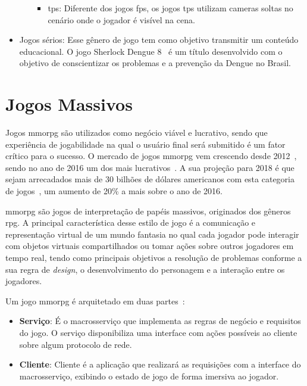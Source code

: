 \begin{itemize}
\begin{itemize}
\begin{itemize}
          \item \ac{tps}: Diferente dos jogos \ac{fps}, os jogos \ac{tps} utilizam cameras soltas no cenário onde o jogador é visível na cena.
        \end{itemize}
    \end{itemize}
  \item Jogos sérios: Esse gênero de jogo tem como objetivo transmitir um conteúdo educacional. O jogo Sherlock Dengue 8~\cite{sherlock_dengue} é um título desenvolvido com o objetivo de conscientizar os problemas e a prevenção da Dengue no Brasil.
\end{itemize}


\section{Jogos Massivos}
\label{sec:mmorpg}



Jogos \ac{mmorpg} são utilizados como negócio viável e lucrativo, sendo que experiência de jogabilidade na qual o usuário final será submitido é um fator crítico para o sucesso.
%
O mercado de jogos \ac{mmorpg} vem crescendo desde 2012~\cite{new_york_times}, sendo no ano de 2016 um dos mais lucrativos~\cite{statista_2016}.
%
A sua projeção para 2018 é que sejam arrecadados mais de 30 bilhões de dólares americanos com esta categoria de jogos~\cite{statista_2018}, um aumento de 20\% a mais sobre o ano de 2016.



\ac{mmorpg} são jogos de interpretação de papéis massivos, originados dos gêneros \ac{rpg}.
%
A principal característica desse estilo de jogo é a comunicação e representação virtual de um mundo fantasia no qual cada jogador pode interagir com objetos virtuais compartilhados ou tomar ações sobre outros jogadores em tempo real, tendo como principais objetivos a resolução de problemas conforme a sua regra de \textit{design}, o desenvolvimento do personagem e a interação entre os jogadores\cite{video_game_technologies}.
%

Um jogo \ac{mmorpg} é arquitetado em duas partes~\cite{mmo_analytic}:
\begin{itemize}
  \item \textbf{Serviço}: É o macrosserviço que implementa as regras de negócio e requisitos do jogo.
  O serviço disponibiliza uma interface com ações possíveis ao cliente sobre algum protocolo de rede.
  \item \textbf{Cliente}: Cliente é a aplicação que realizará as requisições com a interface do macrosserviço, exibindo o estado de jogo de forma imersiva ao jogador.
\end{itemize}


